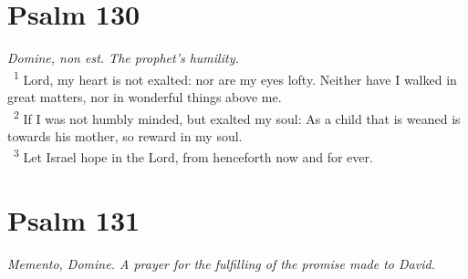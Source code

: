 \documentclass[a5paper,12pt]{article}
\begin{document}
\begin{multicols*}{2}
\section{Psalm 130}
\label{sec:org3516709}
\emph{Domine, non est. The prophet's humility.}\\

~\textsuperscript{1} Lord, my heart is not exalted: nor are my eyes lofty. Neither have I walked in great matters, nor in wonderful things above me.\\
~\textsuperscript{2} If I was not humbly minded, but exalted my soul: As a child that is weaned is towards his mother, so reward in my soul.\\
~\textsuperscript{3} Let Israel hope in the Lord, from henceforth now and for ever.\\

\section{Psalm 131}
\label{sec:org1737ff2}
\emph{Memento, Domine. A prayer for the fulfilling of the promise made to David.}\\


\end{multicols*}
\end{document}
